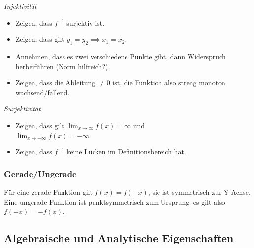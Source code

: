 \documentclass[a4paper,fontsize = 7pt]{scrartcl}
\begin{document}
\emph{Injektivität}
\begin{itemize}
	\item Zeigen, dass $f^{-1}$ surjektiv ist.
	\item Zeigen, dass gilt $y_1=y_2 \implies x_1=x_2$.
	\item Annehmen, dass es zwei verschiedene Punkte gibt, dann Widerspruch herbeiführen (Norm hilfreich?).
	\item Zeigen, dass die Ableitung $\neq 0$ ist, die Funktion also streng monoton wachsend/fallend.
\end{itemize}

\emph{Surjektivität}
\begin{itemize}
	\item Zeigen, dass gilt $\lim_{x\rightarrow\infty}f(x)=\infty$ und \\$\lim_{x\rightarrow-\infty}f(x)=-\infty$ 
	\item Zeigen, dass $f^{-1}$ keine Lücken im Definitionsbereich hat.
\end{itemize}

\subsubsection{Gerade/Ungerade}%


Für eine gerade Funktion gilt $f(x)=f(-x)$, sie ist symmetrisch zur Y-Achse.\\
Eine ungerade Funktion ist punktsymmetrisch zum Ursprung, es gilt also $f(-x)=-f(x)$.

\subsection{Algebraische und Analytische Eigenschaften}%
\end{document}
